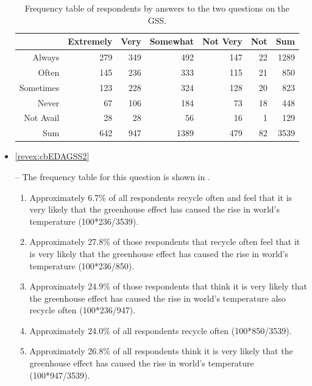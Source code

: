\documentclass[10pt,openany]{book}\usepackage[]{graphicx}\usepackage[]{color}
\begin{document}
\begin{itemize}
\begin{table}[ht]
\centering
\caption{Frequency table of respondents by answers to the two questions on the GSS.} 
\label{tab:GSS2Freq}
\begin{tabular}{rrrrrrr}
  \hline
 & Extremely & Very & Somewhat & Not Very & Not & Sum \\ 
  \hline
Always & 279 & 349 & 492 & 147 & 22 & 1289 \\ 
  Often & 145 & 236 & 333 & 115 & 21 & 850 \\ 
  Sometimes & 123 & 228 & 324 & 128 & 20 & 823 \\ 
  Never & 67 & 106 & 184 & 73 & 18 & 448 \\ 
  Not Avail & 28 & 28 & 56 & 16 & 1 & 129 \\ 
  Sum & 642 & 947 & 1389 & 479 & 82 & 3539 \\ 
   \hline
\end{tabular}
\end{table}

  \item \hypertarget{ans:cbEDAGSS2}{\ref{revex:cbEDAGSS2}} -- The frequency table for this question is shown in .
    \begin{enumerate}
      \item Approximately 6.7\% of all respondents recycle often and feel that it is very likely that the greenhouse effect has caused the rise in world's temperature (100*236/3539).
      \item Approximately 27.8\%  of those respondents that recycle often feel that it is very likely that the greenhouse effect has caused the rise in world's temperature (100*236/850).
      \item Approximately 24.9\%  of those respondents that think it is very likely that the greenhouse effect has caused the rise in world's temperature also recycle often (100*236/947).
      \item Approximately 24.0\%  of all respondents recycle often (100*850/3539).
      \item Approximately 26.8\%  of all respondents think it is very likely that the greenhouse effect has caused the rise in world's temperature (100*947/3539).
    \end{enumerate}


\end{itemize}
\end{document}
